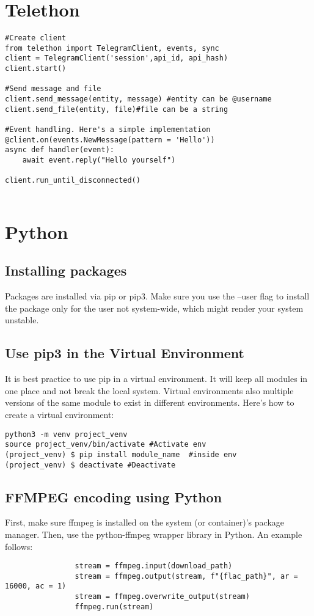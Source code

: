 \documentclass{article}
\begin{document}
\section{Telethon}
\begin{verbatim}
#Create client
from telethon import TelegramClient, events, sync
client = TelegramClient('session',api_id, api_hash)
client.start()

#Send message and file
client.send_message(entity, message) #entity can be @username
client.send_file(entity, file)#file can be a string

#Event handling. Here's a simple implementation
@client.on(events.NewMessage(pattern = 'Hello'))
async def handler(event):
    await event.reply("Hello yourself")

client.run_until_disconnected()


\end{verbatim}

\section{Python}
\subsection{Installing packages}
Packages are installed via pip or pip3. Make sure you use the --user flag to install the package only for the user not system-wide, which might render your system unstable. 
\subsection{Use pip3 in the Virtual Environment}
It is best practice to use pip in a virtual environment. It will keep all modules in one place and not break the local system. Virtual environments also multiple versions of the same module to exist in different environments. Here's how to create a virtual environment: 
\begin{verbatim}
python3 -m venv project_venv
source project_venv/bin/activate #Activate env
(project_venv) $ pip install module_name  #inside env
(project_venv) $ deactivate #Deactivate
\end{verbatim}


\subsection{FFMPEG encoding using Python}
First, make sure ffmpeg is installed on the system (or container)'s package manager. Then, use the python-ffmpeg wrapper library in Python. An example follows:  
\begin{verbatim}
                stream = ffmpeg.input(download_path)
                stream = ffmpeg.output(stream, f"{flac_path}", ar = 16000, ac = 1)
                stream = ffmpeg.overwrite_output(stream)
                ffmpeg.run(stream)
\end{verbatim}
\end{document}
